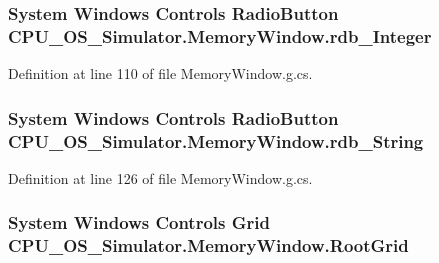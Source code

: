 \subsubsection[{rdb\+\_\+\+Integer}]{\setlength{\rightskip}{0pt plus 5cm}System Windows Controls Radio\+Button C\+P\+U\+\_\+\+O\+S\+\_\+\+Simulator.\+Memory\+Window.\+rdb\+\_\+\+Integer\hspace{0.3cm}{\ttfamily [package]}}\label{class_c_p_u___o_s___simulator_1_1_memory_window_ae54a50c88d1e1479fceddd6d3a51a974}


Definition at line 110 of file Memory\+Window.\+g.\+cs.

\hypertarget{class_c_p_u___o_s___simulator_1_1_memory_window_a68b5f36b0514cacaa8e4eeb3415fcd5a}{}
\subsubsection[{rdb\+\_\+\+String}]{\setlength{\rightskip}{0pt plus 5cm}System Windows Controls Radio\+Button C\+P\+U\+\_\+\+O\+S\+\_\+\+Simulator.\+Memory\+Window.\+rdb\+\_\+\+String\hspace{0.3cm}{\ttfamily [package]}}\label{class_c_p_u___o_s___simulator_1_1_memory_window_a68b5f36b0514cacaa8e4eeb3415fcd5a}


Definition at line 126 of file Memory\+Window.\+g.\+cs.

\hypertarget{class_c_p_u___o_s___simulator_1_1_memory_window_ae2c7b1b6f5c337af62d18b0e2a4d098c}{}
\subsubsection[{Root\+Grid}]{\setlength{\rightskip}{0pt plus 5cm}System Windows Controls Grid C\+P\+U\+\_\+\+O\+S\+\_\+\+Simulator.\+Memory\+Window.\+Root\+Grid\hspace{0.3cm}{\ttfamily [package]}}\label{class_c_p_u___o_s___simulator_1_1_memory_window_ae2c7b1b6f5c337af62d18b0e2a4d098c}


